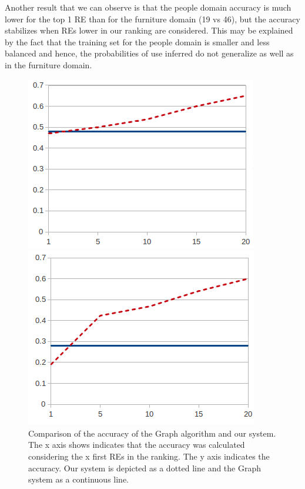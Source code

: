 Another result that we can observe is that the people domain accuracy is much lower for the top 1 RE than for the furniture domain (19 vs 46), but the accuracy stabilizes when REs lower in our ranking are considered. This may be explained by the fact that the training set for the people domain is smaller and less balanced and hence, the probabilities of use inferred do not generalize as well as in the furniture domain. 

\begin{figure}[ht]
\begin{minipage}{0.50\linewidth}
\centering
\includegraphics[width=\textwidth]{images/furniturePrec.png}
\end{minipage}
\begin{minipage}{0.50\linewidth}
\centering
\includegraphics[width=\textwidth]{images/precP.png}
\end{minipage}
\caption{Comparison of the accuracy of the Graph algorithm and our system. The x axis shows indicates that the accuracy was calculated considering the x first REs in the ranking. The y axis indicates the accuracy. Our system is depicted as a dotted line and the Graph system as a continuous line.\label{graficoPresicion}}
\end{figure}

